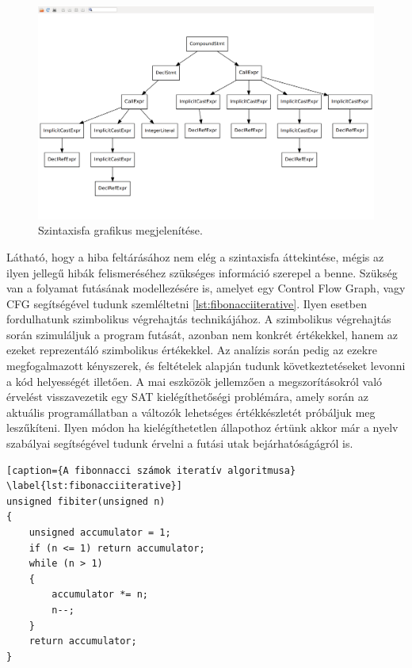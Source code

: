 \documentclass[a4paper,12pt]{report}
\begin{document}
\begin{figure}[h]
\caption{Szintaxisfa grafikus megjelenítése.}
\centering
\includegraphics[scale=0.2]{astview.png}
\end{figure}

Látható, hogy a hiba feltárásához nem elég a szintaxisfa áttekintése, mégis az ilyen jellegű hibák felismeréséhez szükséges információ szerepel a benne. Szükség van a folyamat futásának modellezésére is, amelyet egy Control Flow Graph, vagy CFG segítségével tudunk szemléltetni \ref{lst:fibonacciiterative}. Ilyen esetben fordulhatunk szimbolikus végrehajtás technikájához. A szimbolikus végrehajtás során szimuláljuk a program futását, azonban nem konkrét értékekkel, hanem az ezeket reprezentáló szimbolikus értékekkel. Az analízis során pedig az ezekre megfogalmazott kényszerek, és feltételek alapján tudunk következtetéseket levonni a kód helyességét illetően. A mai eszközök jellemzően a megszorításokról való érvelést visszavezetik egy SAT kielégíthetőségi problémára, amely során az aktuális programállatban a változók lehetséges értékkészletét próbáljuk meg leszűkíteni. Ilyen módon ha kielégíthetetlen állapothoz értünk akkor már a nyelv szabályai segítségével tudunk érvelni a futási utak bejárhatóságágról is.

\begin{minipage}{\linewidth}
\begin{lstlisting}[caption={A fibonnacci számok iteratív algoritmusa}
\label{lst:fibonacciiterative}]
unsigned fibiter(unsigned n)
{
    unsigned accumulator = 1;
    if (n <= 1) return accumulator;
    while (n > 1)
    {
        accumulator *= n;
        n--;
    }
    return accumulator;
}
\end{lstlisting}
\end{minipage}
\end{document}
